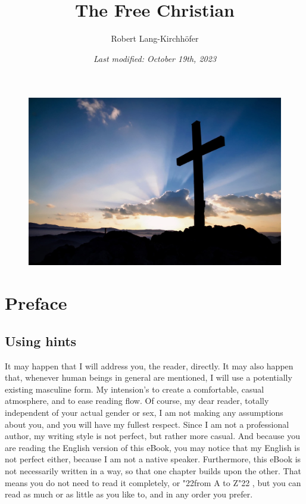 \documentclass[10pt,a5paper]{article}
\title{\textbf{The Free Christian}}
\author{Robert Lang-Kirchh\"ofer}
\date{\textit{Last modified: October 19th, 2023}}
\newcommand{\q}[1]{\char"22{#1}\char"22 }
\begin{document}
	\setlength{\parindent}{0mm}
	\maketitle
	\begin{figure}[h]
		\centering
		\includegraphics[width=1\textwidth,keepaspectratio]{"FreeChristian.jpeg"}
	\end{figure}

	\newpage
	\tableofcontents

	\newpage
	\section{Preface}

	\subsection{Using hints}
		It may happen that I will address you,
		the reader,
		directly.
		It may also happen that,
		whenever human beings in general are mentioned,
		I will use a potentially existing masculine form.
		My intension's to create a comfortable,
		casual atmosphere,
		and to ease reading flow.
		Of course,
		my dear reader,
		totally independent of your actual gender or sex,
		I am not making any assumptions about you,
		and you will have my fullest respect.
		Since I am not a professional author,
		my writing style is not perfect,
		but rather more casual.
		And because you are reading the English version of this eBook,
		you may notice that my English is not perfect either,
		because I am not a native speaker.
		Furthermore,
		this eBook is not necessarily written in a way,
		so that one chapter builds upon the other.
		That means you do not need to read it completely,
		or \q{from A to Z},
		but you can read as much or as little as you like to,
		and in any order you prefer.
	
\end{document}
